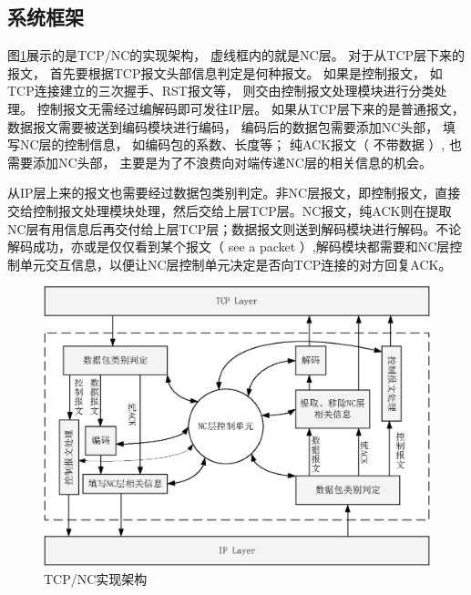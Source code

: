 \subsection{系统框架}
图\ref{JIAGOU_EPS}展示的是TCP/NC的实现架构，
虚线框内的就是NC层。
对于从TCP层下来的报文，
首先要根据TCP报文头部信息判定是何种报文。
如果是控制报文，
如TCP连接建立的三次握手、RST报文等，
则交由控制报文处理模块进行分类处理。
控制报文无需经过编解码即可发往IP层。
如果从TCP层下来的是普通报文，
数据报文需要被送到编码模块进行编码，
编码后的数据包需要添加NC头部，
填写NC层的控制信息，
如编码包的系数、长度等；
纯ACK报文（ 不带数据 ）,
也需要添加NC头部，
主要是为了不浪费向对端传递NC层的相关信息的机会。
\par
从IP层上来的报文也需要经过数据包类别判定。非NC层报文，即控制报文，直接交给控制报文处理模块处理，然后交给上层TCP层。NC报文，纯ACK则在提取NC层有用信息后再交付给上层TCP层；数据报文则送到解码模块进行解码。不论解码成功，亦或是仅仅看到某个报文（ see a packet ）,解码模块都需要和NC层控制单元交互信息，以便让NC层控制单元决定是否向TCP连接的对方回复ACK。
\begin{figure}[htbp]
	\centering
	\includegraphics[width=5in]{figures/jiagou.eps}
	\caption{TCP/NC实现架构}
	\label{JIAGOU_EPS}
\end{figure}

